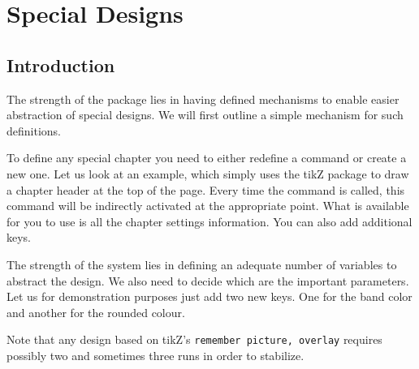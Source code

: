 \makeatletter
{}

\@specialtrue



\@specialtrue

\chapter{Special Designs}
\section{Introduction}


The strength of the package lies in having defined mechanisms to enable easier abstraction of special designs.
We will first outline a simple mechanism for such definitions.

To define any special chapter you need to either redefine a command or create a new one. Let us look at
an example, which simply uses the tikZ package to draw a chapter header at the top of the page. Every time the  command is called, this command will be indirectly activated at the appropriate point.
What is available for you to use is all the chapter settings information. You can also add additional keys.


The strength of the system lies in defining an adequate number of variables to abstract the design. We also need to decide which are the important parameters. Let us for demonstration purposes just add two new keys.
One for the band color and another for the rounded colour.

Note that any design based on tikZ's  \texttt{remember picture, overlay} requires possibly two and sometimes three runs in order to stabilize.



